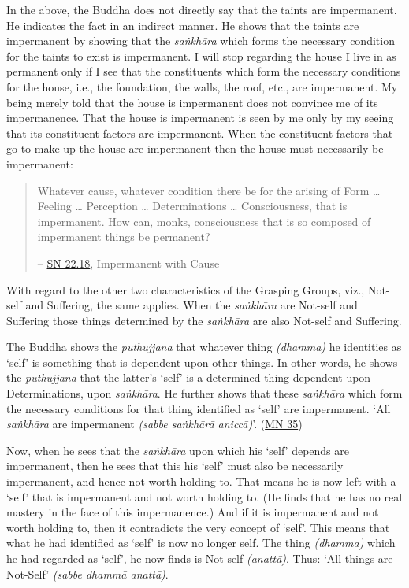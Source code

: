 In the above, the Buddha does not directly say that the taints are impermanent. He indicates the fact in an indirect manner. He shows that the taints are impermanent by showing that the \emph{saṅkhāra} which forms the necessary condition for the taints to exist is impermanent. I will stop regarding the house I live in as permanent only if I see that the constituents which form the necessary conditions for the house, i.e., the foundation, the walls, the roof, etc., are impermanent. My being merely told that the house is impermanent does not convince me of its impermanence. That the house is impermanent is seen by me only by my seeing that its constituent factors are impermanent. When the constituent factors that go to make up the house are impermanent then the house must necessarily be impermanent:

\begin{quote}
Whatever cause, whatever condition there be for the arising of Form \ldots\hspace{0pt} Feeling \ldots\hspace{0pt} Perception \ldots\hspace{0pt} Determinations \ldots\hspace{0pt} Consciousness, that is impermanent. How can, monks, consciousness that is so composed of impermanent things be permanent?

 -- \href{https://suttacentral.net/sn22.18/en/bodhi}{SN 22.18}, Impermanent with Cause
\end{quote}

With regard to the other two characteristics of the Grasping Groups, viz., Not-self and Suffering, the same applies. When the \emph{saṅkhāra} are Not-self and Suffering those things determined by the \emph{saṅkhāra} are also Not-self and Suffering.

The Buddha shows the \emph{puthujjana} that whatever thing \emph{(dhamma)} he identities as `self' is something that is dependent upon other things. In other words, he shows the \emph{puthujjana} that the latter's `self' is a determined thing dependent upon Determinations, upon \emph{saṅkhāra}. He further shows that these \emph{saṅkhāra} which form the necessary conditions for that thing identified as `self' are impermanent. `All \emph{saṅkhāra} are impermanent \emph{(sabbe saṅkhārā aniccā)}'. (\href{https://suttacentral.net/mn35/en/sujato}{MN 35})

Now, when he sees that the \emph{saṅkhāra} upon which his `self' depends are impermanent, then he sees that this his `self' must also be necessarily impermanent, and hence not worth holding to. That means he is now left with a `self' that is impermanent and not worth holding to. (He finds that he has no real mastery in the face of this impermanence.) And if it is impermanent and not worth holding to, then it contradicts the very concept of `self'. This means that what he had identified as `self' is now no longer self. The thing \emph{(dhamma)} which he had regarded as `self', he now finds is Not-self \emph{(anattā)}. Thus: `All things are Not-Self' \emph{(sabbe dhammā anattā)}.

